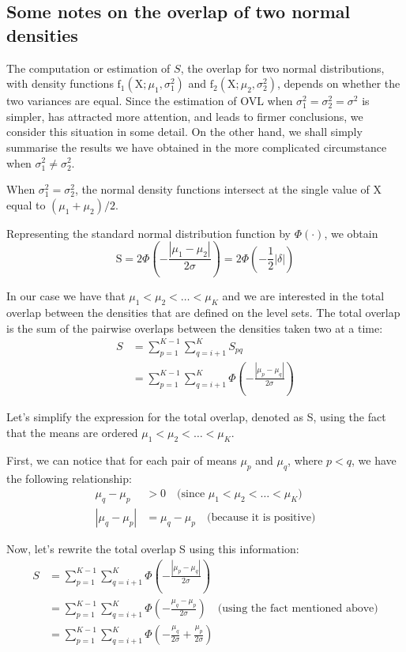 \documentclass[11pt]{amsart}
\begin{document}
\subsection{Some notes on the overlap of two normal densities}


The computation or estimation of $S$, the overlap for two normal distributions, with density functions $\mathrm{f}_1\left(\mathrm{X} ; \mu_1, \sigma_1^2\right)$ and $\mathrm{f}_2\left(\mathrm{X} ; \mu_2, \sigma_2^2\right)$, depends on whether the two variances are equal. Since the estimation of OVL when $\sigma_1^2=\sigma_2^2=\sigma^2$ is simpler, has attracted more attention, and leads to firmer conclusions, we consider this situation in some detail. On the other hand, we shall simply summarise the results we have obtained in the more complicated circumstance when $\sigma_1^2 \neq \sigma_2^2$.

When $\sigma_1^2=\sigma_2^2$, the normal density functions intersect at the single value of $\mathrm{X}$ equal to $\left(\mu_1+\mu_2\right) / 2$. 

Representing the standard normal distribution function by $\Phi(\cdot)$, we obtain
$$
\mathrm{S}=2 \Phi\left(-\frac{\left|\mu_1-\mu_2\right|}{2 \sigma}\right)=2 \Phi\left(-\frac{1}{2}|\delta|\right)
$$

In our case we have that $\mu_1 < \mu_2 < \ldots < \mu_K$ and we are interested in the total overlap between the densities that are defined on the level sets. The total overlap is the sum of the pairwise overlaps between the densities taken two at a time:
\begin{align}
S &= \sum_{p=1}^{K-1} \sum_{q=i+1}^K S_{pq} \nonumber \\
&= \sum_{p=1}^{K-1} \sum_{q=i+1}^K  \Phi\left(-\frac{\left|\mu_p-\mu_q \right|}{2 \sigma}\right)\end{align}


Let's simplify the expression for the total overlap, denoted as S, using the fact that the means are ordered $\mu_1 < \mu_2 < \ldots < \mu_K$.

First, we can notice that for each pair of means $\mu_p$ and $\mu_q$, where $p < q$, we have the following relationship:
\begin{align*}
\mu_q - \mu_p &> 0 \quad \text{(since } \mu_1 < \mu_2 < \ldots < \mu_K \text{)} \\
\left|\mu_q - \mu_p \right| &= \mu_q - \mu_p \quad \text{(because it is positive)}
\end{align*}

Now, let's rewrite the total overlap S using this information:
\begin{align*}
S &= \sum_{p=1}^{K-1} \sum_{q=i+1}^K \Phi\left(-\frac{\left|\mu_p-\mu_q \right|}{2 \sigma}\right) \\
&= \sum_{p=1}^{K-1} \sum_{q=i+1}^K \Phi\left(-\frac{\mu_q - \mu_p}{2 \sigma}\right) \quad \text{(using the fact mentioned above)} \\
&= \sum_{p=1}^{K-1} \sum_{q=i+1}^K \Phi\left(-\frac{\mu_q}{2 \sigma} + \frac{\mu_p}{2 \sigma}\right) \\
\end{align*}
\end{document}
